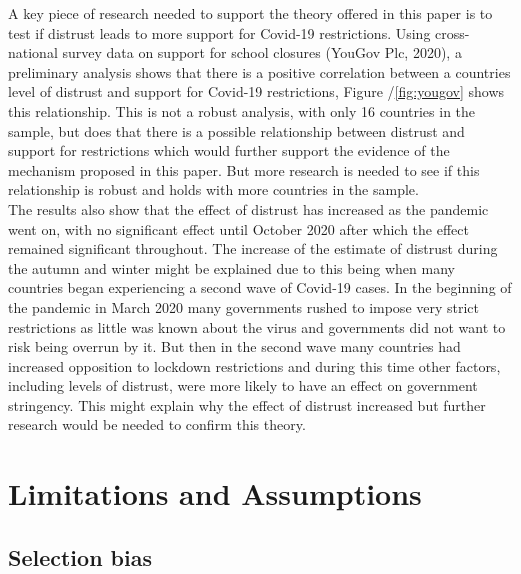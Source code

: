 \documentclass[
  11pt,
]{article}
\begin{document}
A key piece of research needed to support the theory offered in this paper is to test if distrust leads to more support for Covid-19 restrictions. Using cross-national survey data on support for school closures (YouGov Plc, 2020), a preliminary analysis shows that there is a positive correlation between a countries level of distrust and support for Covid-19 restrictions, Figure /\ref{fig:yougov} shows this relationship. This is not a robust analysis, with only 16 countries in the sample, but does that there is a possible relationship between distrust and support for restrictions which would further support the evidence of the mechanism proposed in this paper. But more research is needed to see if this relationship is robust and holds with more countries in the sample.\\

The results also show that the effect of distrust has increased as the pandemic went on, with no significant effect until October 2020 after which the effect remained significant throughout. The increase of the estimate of distrust during the autumn and winter might be explained due to this being when many countries began experiencing a second wave of Covid-19 cases. In the beginning of the pandemic in March 2020 many governments rushed to impose very strict restrictions as little was known about the virus and governments did not want to risk being overrun by it. But then in the second wave many countries had increased opposition to lockdown restrictions and during this time other factors, including levels of distrust, were more likely to have an effect on government stringency. This might explain why the effect of distrust increased but further research would be needed to confirm this theory.\\

\hypertarget{limitations-and-assumptions}{%
\section{Limitations and Assumptions}\label{limitations-and-assumptions}}

\hypertarget{selection-bias}{%
\subsection{Selection bias}\label{selection-bias}}
\end{document}
